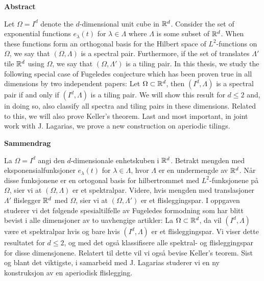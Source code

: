 




\begin{center}\textsf{\textbf{\large Abstract}}\end{center} 

Let $\Omega=I^d$ denote the $d$-dimensional unit cube in $\mathbb{R}^d$. Consider the set of exponential functions $e_\lambda(t)$ for $\lambda \in \Lambda$ where $\Lambda$ is some subset of $\mathbb{R}^d$. When these functions form an orthogonal basis for the Hilbert space of $L^2$-functions on $\Omega$, we say that $(\Omega,\Lambda)$ is a spectral pair. Furthermore, if the set of translates $\Lambda'$ tile $\mathbb{R}^d$ using $\Omega$, we say that $(\Omega,\Lambda')$ is a tiling pair. In this thesis, we study the following special case of Fugeledes conjecture which has been proven true in all dimensions by two independent papers: Let $\Omega\subset\mathbb{R}^d$, then $(I^d,\Lambda)$ is a spectral pair if and only if $(I^d,\Lambda)$ is a tiling pair. We will show this result for $d\leq2$ and, in doing so, also classify all spectra and tiling pairs in these dimensions. Related to this, we will also prove Keller's theorem. Last and most important, in joint work with J. Lagarias, we prove a new construction on aperiodic tilings. 

\begin{center}\textsf{\textbf{\large Sammendrag}}\end{center} 

La $\Omega=I^d$ angi den $d$-dimensionale enhetskuben i $\mathbb{R}^d$. Betrakt mengden med eksponensialfunksjoner $e_\lambda(t)$ for $\lambda \in \Lambda$, hvor $\Lambda$ er en undermengde av $\mathbb{R}^d$. Når disse funksjonene er en ortogonal basis for hilbertrommet med $L^2$-funksjonene på $\Omega$, sier vi at $(\Omega,\Lambda)$ er et spektralpar. Videre, hvis mengden med translasjoner $\Lambda'$ flislegger $\mathbb{R}^d$ med $\Omega$, sier vi at $(\Omega,\Lambda')$ er et flisleggingspar. I oppgaven studerer vi det følgende spesialtilfelle av Fugeledes formodning som har blitt bevist i alle dimensjoner av to uavhengige artikler: La $\Omega\subset\mathbb{R}^d$, da vil $(I^d,\Lambda)$ være et spektralpar hvis og bare hvis $(I^d,\Lambda)$ er et flisleggingspar. Vi viser dette resultatet for $d\leq2$, og med det også klassifisere alle spektral- og flisleggingspar for disse dimensjonene. Relatert til dette vil vi også bevise Keller's teorem. Sist og blant det viktigste, i samarbeid med J. Lagarias studerer vi en ny konstruksjon av en aperiodisk flislegging.  


 
